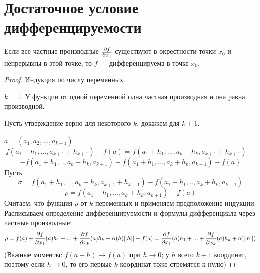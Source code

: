     \section{Достаточное условие дифференцируемости}
    
    \begin{theorem}
    	Если все частные производные $\frac{\partial f}{\partial x_j}$ существуют в окрестности точки $x_0$ и непрерывны в этой точке, то $f$ — дифференцируема в точке $x_0$.
    \end{theorem}
    
    \begin{proof}
    	Индукция по числу переменных.
    	
    	$k = 1.$ У функции от одной переменной одна частная производная и она равна производной.
    	
    	Пусть утверждение верно для некоторого $k$, докажем для $k + 1$.
    	
    	$a = (a_1, a_2, ..., a_{k + 1})$
    	\[ f(a_1 + h_1, ..., a_{k + 1} + h_{k + 1}) - f(a) = f(a_1 + h_1, ..., a_k + h_k, a_{k + 1} + h_{k + 1}) - \]
    	\[ - f(a_1 + h_1, .., a_k + h_k, a_{k + 1}) + f(a_1 + h_1, ..., a_k + h_k, a_{k + 1}) - f(a) \]
    	Пусть
    	\[ \sigma = f(a_1 + h_1, ..., a_k + h_k, a_{k + 1} + h_{k + 1}) - f(a_1 + h_1, .., a_k + h_k, a_{k + 1}) \]
    	\[ \rho = f(a_1 + h_1, ..., a_k + h_k, a_{k + 1}) - f(a) \]
    	Считаем, что функция $\rho$ от $k$ переменных и применяем предположение индукции. Расписываем определение дифференцируемости и формулы дифференциала через частные производные:
    	\[ \rho = f(a) + \frac{\partial f}{\partial x_1}(a)h_1 + ... + \frac{\partial f}{\partial x_k}(a)h_k + \alpha(h)||h|| - f(a) = \frac{\partial f}{\partial x_1}(a)h_1 + ... + \frac{\partial f}{\partial x_k}(a)h_k + o(||h||) \]
    	(Важные моменты: $f(a + h) \to f(a)$ при $h \to 0$; у $h$ всего $k + 1$ координат, поэтому если $h \to 0$, то его первые $k$ координат тоже стремятся к нулю)
    	

\end{proof}
